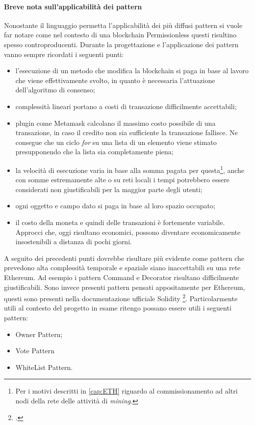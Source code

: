 \paragraph{Breve nota sull'applicabilità dei pattern}
Nonostante il linguaggio permetta l’applicabilità dei più diffusi pattern si vuole far notare come nel contesto di una blockchain Permissionless questi risultino spesso controproducenti. 
Durante la progettazione e l’applicazione dei pattern vanno sempre ricordati i seguenti punti:
\begin{itemize}
    \item l’esecuzione di un metodo che modifica la blockchain si paga in base al lavoro che viene effettivamente svolto, in quanto è necessaria l'attuazione dell'algoritmo di consenso;
    \item complessità lineari portano a costi di transazione difficilmente accettabili;
    \item plugin come Metamask calcolano il massimo costo possibile di una transazione, in caso il credito non sia sufficiente la transazione fallisce. Ne consegue che un ciclo \emph{for} su una lista di un elemento viene stimato presupponendo che la lista sia completamente piena;
    \item la velocità di esecuzione varia in base alla somma pagata per questa\footnote{Per i motivi descritti in \ref{cap:ETH} riguardo al commissionamento ad altri nodi della rete delle attività di \emph{mining}.}, anche con somme estremamente alte o su reti locali i tempi potrebbero essere considerati non giustificabili per la maggior parte degli utenti;
    \item ogni oggetto e campo dato si paga in base al loro spazio occupato;
    \item il costo della moneta e quindi delle transazioni è fortemente variabile. Approcci che, oggi risultano economici, possono diventare economicamente insostenibili a distanza di pochi giorni.
\end{itemize}
A seguito dei precedenti punti dovrebbe risultare più evidente come pattern che prevedono alta complessità temporale e spaziale siano inaccettabili su una rete Ethereum. Ad esempio i pattern Command e Decorator risultano difficilmente giustificabili.
Sono invece presenti pattern pensati appositamente per Ethereum, questi sono presenti nella documentazione ufficiale Solidity \footcite{site:solidity-documentation}. Particolarmente utili al contesto del progetto in esame ritengo possano essere utili i seguenti pattern: 
\begin{itemize}
    \item Owner Pattern;
    \item Vote Pattern 
    \item WhiteList Pattern.
\end{itemize}

